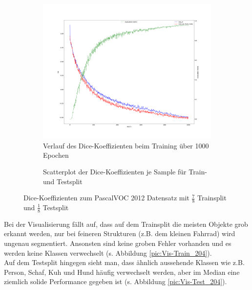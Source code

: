 \begin{figure}[H]
\centering
\begin{subfigure}{\textwidth}
\centering
\includegraphics[width=.6\textwidth]{Pictures/nnUnet/Praxis/Task204-Pascal-VOC12-achtel-testsplit/progress_204-Pascal-VOC12-achtel-testsplit.png}
\caption{Verlauf des Dice-Koeffizienten beim Training über 1000 Epochen}
\label{pic:Prog_204}
\end{subfigure}

\begin{subfigure}{\textwidth}

\caption{Scatterplot der Dice-Koeffizienten je Sample für Train- und Testsplit}
\label{pic:Dice_204}
\end{subfigure}

\caption{Dice-Koeffizienten zum PascalVOC 2012 \cite{PascalVOCDatensatz} Datensatz mit $\frac{7}{8}$ Trainsplit und $\frac{1}{8}$ Testsplit}
\end{figure}


Bei der Visualisierung fällt auf, dass auf dem Trainsplit die meisten Objekte grob erkannt werden, nur bei feineren Strukturen (z.B. dem kleinen Fahrrad) wird ungenau segmentiert. Ansonsten sind keine groben Fehler vorhanden und es werden keine Klassen verwechselt (s. Abbildung \ref{pic:Vis-Train_204}).\\
Auf dem Testsplit hingegen sieht man, dass ähnlich aussehende Klassen wie z.B. Person, Schaf, Kuh und Hund häufig verwechselt werden, aber im Median eine ziemlich solide Performance gegeben ist (s. Abbildung \ref{pic:Vis-Test_204}).

